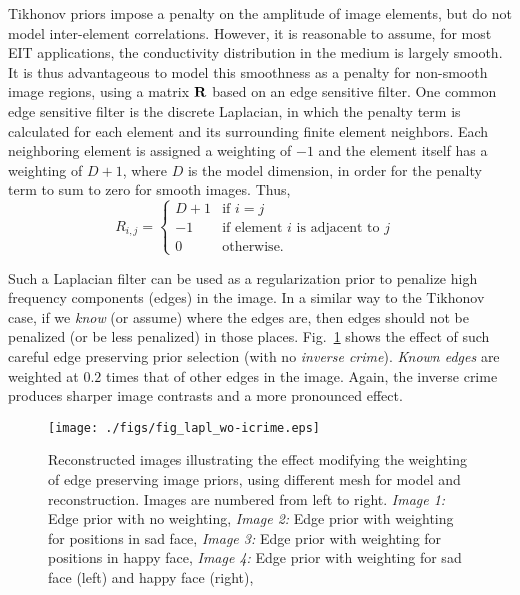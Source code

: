 \documentclass[12pt]{iopart}
\begin{document}
Tikhonov priors impose a penalty on the amplitude of image
elements, but do not model inter-element correlations. 
However, it is reasonable to assume, for most EIT applications,
the conductivity distribution in the medium is largely
smooth. It is thus advantageous to model this smoothness
as a penalty for non-smooth image regions, using a
matrix $\bf R$ based on an edge sensitive filter.
One common edge sensitive filter is the discrete Laplacian,
in which the penalty term is calculated for each element
and its surrounding finite element neighbors. Each
neighboring element is assigned a weighting of $-1$ and the element itself
has a weighting of $D+1$, where $D$ is the model dimension,
in order for the penalty term to sum to zero for smooth
images. Thus,
\begin{equation}
R_{i,j} =   \left\{ 
   \begin{array}{ll}
      D+1    & \mbox{if $i=j$ } \\
      -1     & \mbox{if element $i$ is adjacent to $j$ } \\
      0      & \mbox{otherwise.}
   \end{array}
             \right.
\end{equation}


Such a Laplacian filter can be used as a regularization prior
to penalize high frequency components (edges) in the image.
In a similar way to the Tikhonov case, 
if we {\em know} (or assume) where the edges are,
then edges should not be penalized (or be less penalized) in
those places. Fig.~\ref{fig:laplprior}
shows the effect of such careful
edge preserving prior selection (with no {\em inverse crime}).
{\em Known edges} are weighted at $0.2$ times that of other
edges in the image. Again, the inverse crime produces sharper
image contrasts and a more pronounced effect.

%
%
\begin{figure}[th]
\begin{flushright}
\texttt{[image: ./figs/fig\_lapl\_wo-icrime.eps]}
\caption{\small 
Reconstructed images illustrating the effect modifying the
weighting of edge preserving image priors,
using different mesh for model and reconstruction.
Images are numbered from left to right.
{\em Image 1:} Edge prior with no weighting,
{\em Image 2:} Edge prior with weighting for positions in sad face,
{\em Image 3:} Edge prior with weighting for positions in happy face,
{\em Image 4:} Edge prior with weighting for sad face (left) and
happy face (right),
 }
 \label{fig:laplprior}
\end{flushright}
\end{figure}
\end{document}
